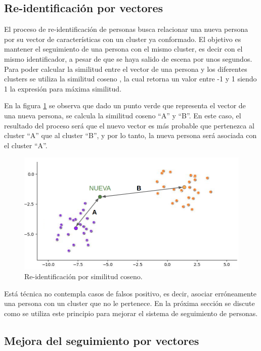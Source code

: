 \subsection{Re-identificación por vectores}

El proceso de re-identificación de personas busca relacionar una nueva persona por su vector de características con un cluster ya conformado. El objetivo es mantener el seguimiento de una persona con el mismo cluster, es decir con el mismo identificador, a pesar de que se haya salido de escena por unos segundos. Para poder calcular la similitud entre el vector de una persona y los diferentes clusters se utiliza la similitud coseno \citep{COSINE_SIMILARITY}, la cual retorna un valor entre -1 y 1 siendo 1 la expresión para máxima similitud.

En la figura \ref{fig:similitudCoseno} se observa que dado un punto verde que representa el vector de una nueva persona, se calcula la similitud coseno ``A'' y ``B''. En este caso, el resultado del proceso será que el nuevo vector es más probable que pertenezca al cluster ``A'' que al cluster ``B'', y por lo tanto, la nueva persona será asociada con el cluster ``A''.

\begin{figure}[ht]
	\centering
	\includegraphics[scale=.6]{./Figures/similitudCoseno.png}
	\caption{Re-identificación por similitud coseno.}
	\label{fig:similitudCoseno}
\end{figure}

Está técnica no contempla casos de falsos positivo, es decir, asociar erróneamente una persona con un cluster que no le pertenece. En la próxima sección se discute como se utiliza este principio para mejorar el sistema de seguimiento de personas.

\subsection{Mejora del seguimiento por vectores}

